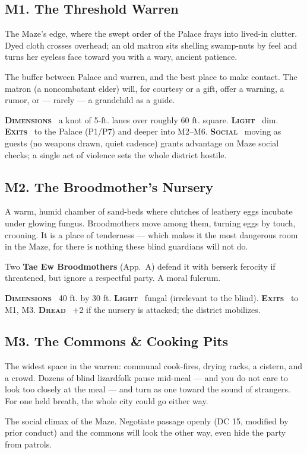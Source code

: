 \documentclass[10pt,twoside]{article}
\newcommand{\tech}[1]{\textbf{\scshape\textcolor{stone}{#1}}\ }
\begin{document}
\subsection{M1. The Threshold Warren}
\begin{readaloud}
The Maze's edge, where the swept order of the Palace frays into lived-in clutter.
Dyed cloth crosses overhead; an old matron sits shelling swamp-nuts by feel and turns
her eyeless face toward you with a wary, ancient patience.
\end{readaloud}
The buffer between Palace and warren, and the best place to make contact. The matron
(a noncombatant elder) will, for courtesy or a gift, offer a warning, a rumor, or ---
rarely --- a grandchild as a guide.

\begin{techbox}
\tech{Dimensions} a knot of 5-ft. lanes over roughly 60 ft. square. \tech{Light} dim.
\tech{Exits} to the Palace (P1/P7) and deeper into M2--M6. \tech{Social} moving as
guests (no weapons drawn, quiet cadence) grants advantage on Maze social checks; a
single act of violence sets the whole district hostile.
\end{techbox}

\subsection{M2. The Broodmother's Nursery}
\begin{readaloud}
A warm, humid chamber of sand-beds where clutches of leathery eggs incubate under
glowing fungus. Broodmothers move among them, turning eggs by touch, crooning. It is
a place of tenderness --- which makes it the most dangerous room in the Maze, for
there is nothing these blind guardians will not do.
\end{readaloud}
Two \textbf{Tae Ew Broodmothers} (App.\ A) defend it with berserk ferocity if
threatened, but ignore a respectful party. A moral fulcrum.

\begin{techbox}
\tech{Dimensions} 40 ft. by 30 ft. \tech{Light} fungal (irrelevant to the blind).
\tech{Exits} to M1, M3. \tech{Dread} +2 if the nursery is attacked; the district
mobilizes.
\end{techbox}

\subsection{M3. The Commons \& Cooking Pits}
\begin{readaloud}
The widest space in the warren: communal cook-fires, drying racks, a cistern, and a
crowd. Dozens of blind lizardfolk pause mid-meal --- and you do not care to look too
closely at the meal --- and turn as one toward the sound of strangers. For one held
breath, the whole city could go either way.
\end{readaloud}
The social climax of the Maze. Negotiate passage openly (DC 15, modified by prior
conduct) and the commons will look the other way, even hide the party from patrols.
\end{document}
